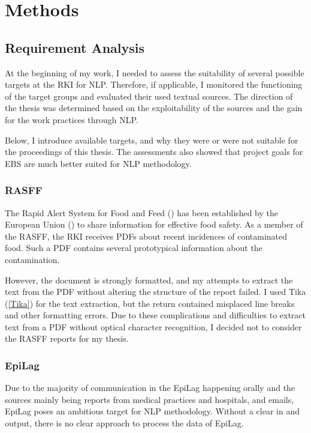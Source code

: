 \chapter{Methods}

\section{Requirement Analysis}
At the beginning of my work, I needed to assess the suitability of several possible targets at the RKI for NLP.
Therefore, if applicable, I monitored the functioning of the target groups and evaluated their used textual sources.
The direction of the thesis was determined based on the exploitability of the sources and the gain for the work practices through NLP.

Below, I introduce available targets, and why they were or were not suitable for the proceedings of this thesis. The assessments also showed that project goals for EBS are much better suited for NLP methodology.

\subsection{RASFF}
The Rapid Alert System for Food and Feed () has been established by the European Union () to share information for effective food safety. As a member of the RASFF, the RKI receives PDFs about recent incidences of contaminated food. Such a PDF contains several prototypical information about the contamination.

However, the document is strongly formatted, and my attempts to extract the text from the PDF without altering the structure of the report failed. I used Tika (\ref{Tika}) for the text extraction, but the return contained misplaced line breaks and other formatting errors. Due to these complications and difficulties to extract text from a PDF without optical character recognition, I decided not to consider the RASFF reports for my thesis.

\subsection{EpiLag}
Due to the majority of communication in the EpiLag happening orally and the sources mainly being reports from medical practices and hospitals, and emails, EpiLag poses an ambitious target for NLP methodology.
Without a clear in and output, there is no clear approach to process the data of EpiLag.

